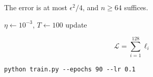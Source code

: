 \documentclass[11pt,a4paper]{article}
\begin{document}
\begin{theorem}[Bound 3]
\label{thm:bound}
The error is at most $\epsilon^{2}/4$, and $n \geq 64$ suffices.
\end{theorem}

\begin{algorithm}[t]
\caption{Training}
\begin{algorithmic}[1]
\State $\eta \gets 10^{-3}$, $T \gets 100$
  \State update
\EndFor
\end{algorithmic}
\end{algorithm}

\begin{equation}
\mathcal L = \sum_{i=1}^{128} \ell_i
\label{eq:loss}
\end{equation}

\begin{verbatim}
python train.py --epochs 90 --lr 0.1
\end{verbatim}



\end{document}
